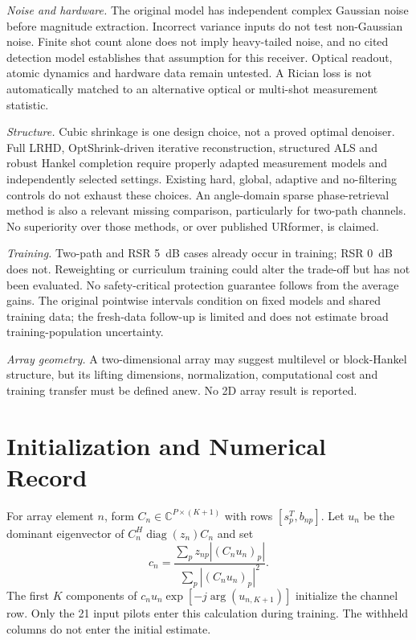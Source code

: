 \documentclass[journal]{IEEEtran}
\DeclareMathOperator{\diag}{diag}
\begin{document}
\textit{Noise and hardware.} The original model has independent complex
Gaussian noise before magnitude extraction. Incorrect variance inputs
do not test non-Gaussian noise. Finite shot count alone does not imply
heavy-tailed noise, and no cited detection model establishes that
assumption for this receiver. Optical readout, atomic dynamics and
hardware data remain untested. A Rician loss is not automatically matched
to an alternative optical or multi-shot measurement statistic.

\textit{Structure.} Cubic shrinkage is one design choice, not a proved
optimal denoiser. Full LRHD, OptShrink-driven iterative reconstruction,
structured ALS and robust Hankel completion require properly adapted
measurement models and independently selected settings. Existing hard,
global, adaptive and no-filtering controls do not exhaust these choices.
An angle-domain sparse phase-retrieval method is also a relevant missing
comparison, particularly for two-path channels. No superiority over those
methods, or over published URformer, is claimed.

\textit{Training.} Two-path and RSR 5~dB cases already occur in training;
RSR 0~dB does not. Reweighting or curriculum training could alter the
trade-off but has not been evaluated. No safety-critical protection
guarantee follows from the average gains. The original pointwise
intervals condition on fixed models and shared training data; the
fresh-data follow-up is limited and does not estimate broad
training-population uncertainty.

\textit{Array geometry.} A two-dimensional array may suggest multilevel
or block-Hankel structure, but its lifting dimensions, normalization,
computational cost and training transfer must be defined anew. No 2D
array result is reported.

\section{Initialization and Numerical Record}
For array element $n$, form $C_n\in\mathbb C^{P\times(K+1)}$ with rows
$[s_p^T,b_{np}]$. Let $u_n$ be the dominant eigenvector of
$C_n^H\diag(z_n)C_n$ and set
\begin{equation}
 c_n=\frac{\sum_p z_{np}|(C_nu_n)_p|}{\sum_p|(C_nu_n)_p|^2}.
\end{equation}
The first $K$ components of $c_nu_n\exp[-j\arg(u_{n,K+1})]$ initialize
the channel row. Only the 21 input pilots enter this calculation during
training. The withheld columns do not enter the initial estimate.
\end{document}

